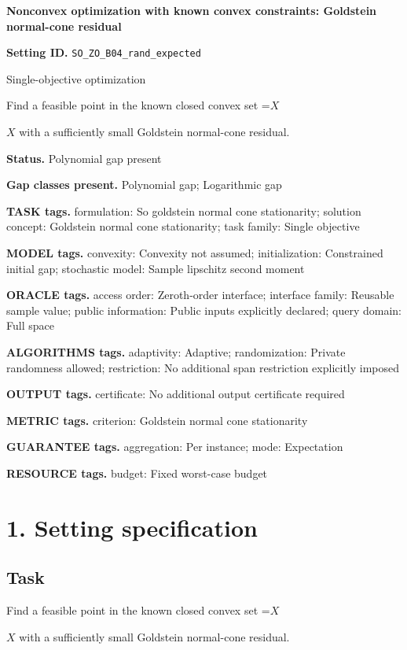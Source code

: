 \documentclass[10pt,a4paper]{article}
\newcommand{\AtlasMath}[1]{\par\begingroup\centering\setbox0=\hbox{$\displaystyle #1$}\ifdim\wd0>1.4\linewidth\typeout{ATLAS WIDE FORMULA: \the\wd0}\fi\ifdim\wd0>\linewidth\resizebox{\linewidth}{!}{\box0}\else\box0\fi\par\endgroup}
\newcommand{\AtlasInlineMath}[1]{\begingroup\setbox0=\hbox{$#1$}\ifdim\wd0>.4\linewidth\endgroup\AtlasMath{#1}\else\endgroup$#1$\fi}
\begin{document}
\raggedright

{\LARGE\bfseries\sffamily\color{AtlasNavy} Nonconvex optimization with known convex constraints: Goldstein normal-cone residual\par}\vspace{5pt}
\textbf{Setting ID.} \texttt{SO\_\allowbreak{}ZO\_\allowbreak{}B04\_\allowbreak{}rand\_\allowbreak{}expected}

Single-objective optimization

Find a feasible point in the known closed convex set \AtlasInlineMath{X} with a sufficiently small Goldstein normal-cone residual.

\textbf{Status.} Polynomial gap present

\textbf{Gap classes present.} Polynomial gap; Logarithmic gap

\textbf{TASK tags.} formulation: So goldstein normal cone stationarity; solution concept: Goldstein normal cone stationarity; task family: Single objective

\textbf{MODEL tags.} convexity: Convexity not assumed; initialization: Constrained initial gap; stochastic model: Sample lipschitz second moment

\textbf{ORACLE tags.} access order: Zeroth-order interface; interface family: Reusable sample value; public information: Public inputs explicitly declared; query domain: Full space

\textbf{ALGORITHMS tags.} adaptivity: Adaptive; randomization: Private randomness allowed; restriction: No additional span restriction explicitly imposed

\textbf{OUTPUT tags.} certificate: No additional output certificate required

\textbf{METRIC tags.} criterion: Goldstein normal cone stationarity

\textbf{GUARANTEE tags.} aggregation: Per instance; mode: Expectation

\textbf{RESOURCE tags.} budget: Fixed worst-case budget

\section{1. Setting specification}
\subsection{Task}
Find a feasible point in the known closed convex set \AtlasInlineMath{X} with a sufficiently small Goldstein normal-cone residual.
\end{document}

